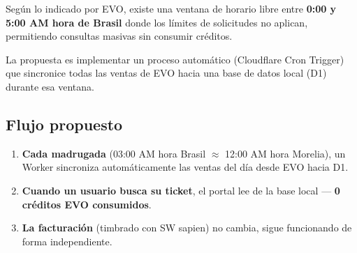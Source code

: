 \documentclass[11pt,a4paper]{article}
\begin{document}
Según lo indicado por EVO, existe una ventana de horario libre entre \textbf{0:00 y 5:00 AM hora de Brasil} donde los límites de solicitudes no aplican, permitiendo consultas masivas sin consumir créditos.

La propuesta es implementar un proceso automático (Cloudflare Cron Trigger) que sincronice todas las ventas de EVO hacia una base de datos local (D1) durante esa ventana.

\begin{center}
\shorthandoff{>}
\shorthandon{>}
\end{center}

\subsection*{Flujo propuesto}

\begin{enumerate}[leftmargin=1.5em, itemsep=0.3em]
  \item \textbf{Cada madrugada} (03:00 AM hora Brasil $\approx$ 12:00 AM hora Morelia), un Worker sincroniza automáticamente las ventas del día desde EVO hacia D1.
  \item \textbf{Cuando un usuario busca su ticket}, el portal lee de la base local --- \textbf{0 créditos EVO consumidos}.
  \item \textbf{La facturación} (timbrado con SW sapien) no cambia, sigue funcionando de forma independiente.
\end{enumerate}
\end{document}
